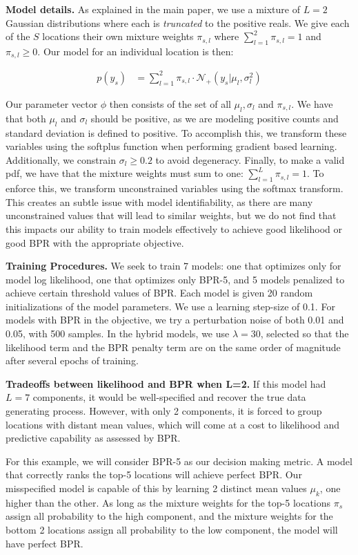 \textbf{Model details.} As explained in the main paper, we use a mixture of $L=2$ Gaussian distributions where each is \emph{truncated} to the positive reals. We give each of the $S$ locations their own mixture weights $\pi_{s,l}$ where  $\sum_{l=1}^2 \pi_{s,l} = 1$ and $\pi_{s,l} \geq 0$. Our model for an individual location is then:

\begin{align}
    p(y_s) &= \sum_{l=1}^2 \pi_{s,l} \cdot \mathcal{N}_+(y_s|\mu_l, \sigma_l^2)
\end{align}

Our parameter vector $\phi$ then consists of the set of all $\mu_l, \sigma_l$ and $\pi_{s,l}$. We have that both $\mu_l$ and $\sigma_l$ should be positive, as we are modeling positive counts and standard deviation is defined to positive. To accomplish this, we transform these variables using the softplus function when performing gradient based learning. Additionally, we constrain $\sigma_l \geq 0.2$ to avoid degeneracy. Finally, to make a valid pdf, we have that the mixture weights must sum to one: $\sum_{l=1}^L \pi_{s,l}=1$. To enforce this, we transform unconstrained variables using the softmax transform. This creates an subtle issue with model identifiability, as there are many unconstrained values that will lead to similar weights, but we do not find that this impacts our ability to train models effectively to achieve good likelihood or good BPR with the appropriate objective.  

\textbf{Training Procedures.}
We seek to train 7 models: one that optimizes only for model log likelihood, one that optimizes only BPR-5, and 5 models penalized to achieve certain threshold values of BPR. Each model is given 20 random initializations of the model parameters. We use a learning step-size of 0.1. For models with BPR in the objective, we try a perturbation noise of both 0.01 and 0.05, with 500 samples. In the hybrid models, we use $\lambda=30$, selected so that the likelihood term and the BPR penalty term are on the same order of magnitude after several epochs of training.

\textbf{Tradeoffs between likelihood and BPR when L=2.}
If this model had $L=7$ components, it would be well-specified and recover the true data generating process. However, with only 2 components, it is forced to group locations with distant mean values, which will come at a cost to likelihood and predictive capability as assessed by BPR.

For this example, we will consider BPR-5 as our decision making metric. A model that correctly ranks the top-5 locations will achieve perfect BPR. Our misspecified model is capable of this by learning 2 distinct mean values $\mu_k$, one higher than the other. As long as the mixture weights for the top-5 locations $\pi_{s}$ assign all probability to the high component, and the mixture weights for the bottom 2 locations assign all probability to the low component, the model will have perfect BPR. 

